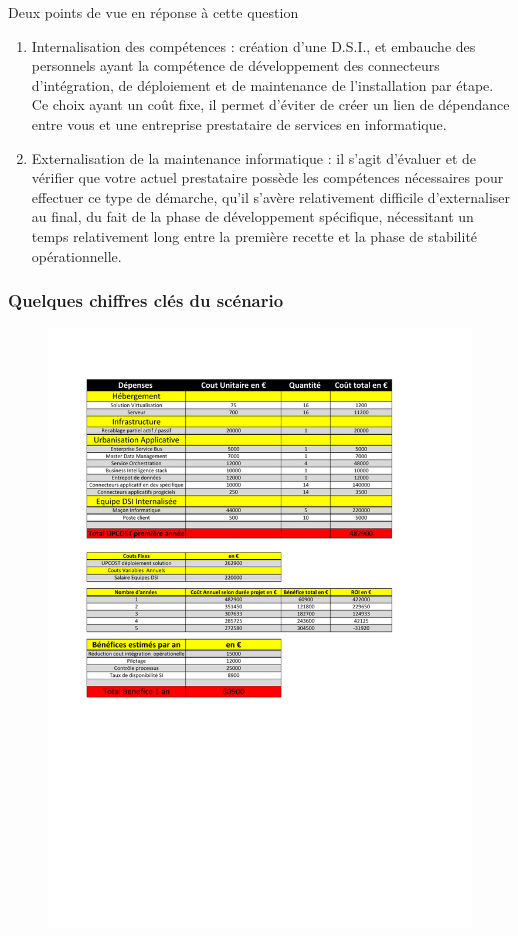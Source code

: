 Deux points de vue en réponse à cette question\\
\begin{enumerate}
\item Internalisation des compétences : création d'une D.S.I., et embauche des personnels ayant la compétence de développement des connecteurs d'intégration, de déploiement et de maintenance de l'installation par étape. Ce choix ayant un coût fixe, il permet d'éviter de créer un lien de dépendance entre vous et une entreprise prestataire de services en informatique.
\item Externalisation de la maintenance informatique : il s'agit d'évaluer et de vérifier que votre actuel prestataire possède les compétences nécessaires pour effectuer ce type de démarche, qu'il s'avère relativement difficile d'externaliser au final, du fait de la phase de développement spécifique, nécessitant un temps relativement long entre la première recette et la phase de stabilité opérationnelle.
\end{enumerate}

\subsubsection{Quelques chiffres clés du scénario}
\begin{figure}[H]
\begin{center}
 \includegraphics [scale=0.5]{ChiffresScenario1.pdf}
\end{center}  
\end{figure}

